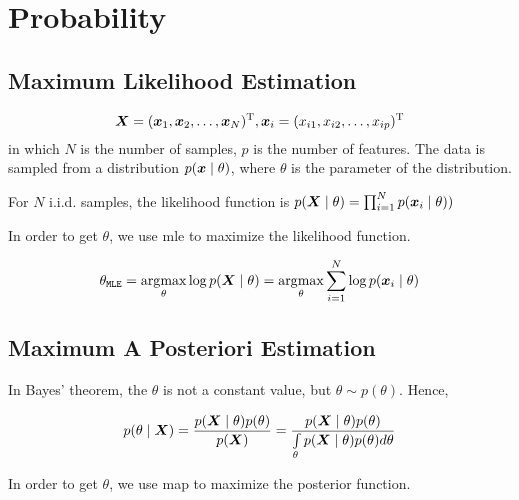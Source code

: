 
\chapter{Probability}\label{chp:Probability}
\minitoc

\section{Maximum Likelihood Estimation}

\begin{equation}
	\vX = (\vx_1, \vx_2, \dots, \vx_N)\transp, \vx_i = (x_{i1}, x_{i2},\dots, x_{ip})\transp
\end{equation}
in which $N$ is the number of samples, $p$ is the number of features.
The data is sampled from a distribution $p\giventhat{\vx}{\theta}$, where $\theta$ is the parameter of the distribution.


For \(N\)  i.i.d. samples, the likelihood function is \(p \giventhat{\vX}{\theta} = \prod_{i=1}^{N} p \giventhat{\vx_i}{\theta}) \)

In order to get \(\theta\), we use \gls{mle}  to maximize the likelihood function.

\begin{equation}
	\theta_{\mathtt{MLE}} = \argmax_{\theta} \log p\giventhat{\vX}{\theta} = \argmax_{\theta} \sum_{i=1}^{N} \log p\giventhat{\vx_i}{\theta}
\end{equation}

\section{Maximum A Posteriori Estimation}
In Bayes' theorem, the \(\theta\) is not a constant value, but \(\theta \sim  p(\theta) \).
Hence,

\begin{equation}
	p\giventhat{\theta}{\vX} = \frac{p\giventhat{\vX}{\theta} p(\theta)}{p(\vX)}  =  \frac{p\giventhat{\vX}{\theta} p(\theta)}{\int\limits_{\theta} p\giventhat{\vX}{\theta} p(\theta) d\theta}
\end{equation}


In order to get \(\theta\), we use \gls{map}  to maximize the posterior function.


